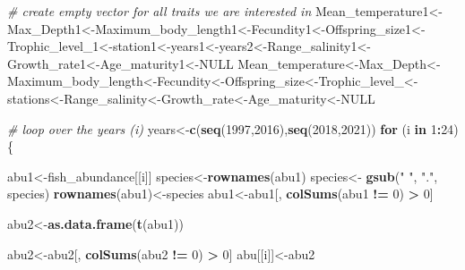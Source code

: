 \documentclass[
]{article}
\newenvironment{Shaded}{\begin{snugshade}}{\end{snugshade}}
\newcommand{\CommentTok}[1]{\textcolor[rgb]{0.56,0.35,0.01}{\textit{#1}}}
\newcommand{\ConstantTok}[1]{\textcolor[rgb]{0.56,0.35,0.01}{#1}}
\newcommand{\ControlFlowTok}[1]{\textcolor[rgb]{0.13,0.29,0.53}{\textbf{#1}}}
\newcommand{\DecValTok}[1]{\textcolor[rgb]{0.00,0.00,0.81}{#1}}
\newcommand{\FunctionTok}[1]{\textcolor[rgb]{0.13,0.29,0.53}{\textbf{#1}}}
\newcommand{\NormalTok}[1]{#1}
\newcommand{\OtherTok}[1]{\textcolor[rgb]{0.56,0.35,0.01}{#1}}
\newcommand{\SpecialCharTok}[1]{\textcolor[rgb]{0.81,0.36,0.00}{\textbf{#1}}}
\newcommand{\StringTok}[1]{\textcolor[rgb]{0.31,0.60,0.02}{#1}}
\begin{document}
\begin{Shaded}
\begin{Highlighting}[]
\CommentTok{\# create empty vector for all traits we are interested in }
\NormalTok{Mean\_temperature1}\OtherTok{\textless{}{-}}\NormalTok{Max\_Depth1}\OtherTok{\textless{}{-}}\NormalTok{Maximum\_body\_length1}\OtherTok{\textless{}{-}}\NormalTok{Fecundity1}\OtherTok{\textless{}{-}}\NormalTok{Offspring\_size1}\OtherTok{\textless{}{-}}\NormalTok{Trophic\_level\_1}\OtherTok{\textless{}{-}}\NormalTok{station1}\OtherTok{\textless{}{-}}\NormalTok{years1}\OtherTok{\textless{}{-}}\NormalTok{years2}\OtherTok{\textless{}{-}}\NormalTok{Range\_salinity1}\OtherTok{\textless{}{-}}\NormalTok{Growth\_rate1}\OtherTok{\textless{}{-}}\NormalTok{Age\_maturity1}\OtherTok{\textless{}{-}}\ConstantTok{NULL}
\NormalTok{Mean\_temperature}\OtherTok{\textless{}{-}}\NormalTok{Max\_Depth}\OtherTok{\textless{}{-}}\NormalTok{Maximum\_body\_length}\OtherTok{\textless{}{-}}\NormalTok{Fecundity}\OtherTok{\textless{}{-}}\NormalTok{Offspring\_size}\OtherTok{\textless{}{-}}\NormalTok{Trophic\_level\_}\OtherTok{\textless{}{-}}\NormalTok{stations}\OtherTok{\textless{}{-}}\NormalTok{Range\_salinity}\OtherTok{\textless{}{-}}\NormalTok{Growth\_rate}\OtherTok{\textless{}{-}}\NormalTok{Age\_maturity}\OtherTok{\textless{}{-}}\ConstantTok{NULL}

\CommentTok{\# loop over the years (i)}
\NormalTok{years}\OtherTok{\textless{}{-}}\FunctionTok{c}\NormalTok{(}\FunctionTok{seq}\NormalTok{(}\DecValTok{1997}\NormalTok{,}\DecValTok{2016}\NormalTok{),}\FunctionTok{seq}\NormalTok{(}\DecValTok{2018}\NormalTok{,}\DecValTok{2021}\NormalTok{))}
\ControlFlowTok{for}\NormalTok{ (i }\ControlFlowTok{in} \DecValTok{1}\SpecialCharTok{:}\DecValTok{24}\NormalTok{)\{}
  
\NormalTok{  abu1}\OtherTok{\textless{}{-}}\NormalTok{fish\_abundance[[i]]}
\NormalTok{  species}\OtherTok{\textless{}{-}}\FunctionTok{rownames}\NormalTok{(abu1)}
\NormalTok{  species}\OtherTok{\textless{}{-}} \FunctionTok{gsub}\NormalTok{(}\StringTok{" "}\NormalTok{, }\StringTok{"."}\NormalTok{, species)}
  \FunctionTok{rownames}\NormalTok{(abu1)}\OtherTok{\textless{}{-}}\NormalTok{species}
\NormalTok{  abu1}\OtherTok{\textless{}{-}}\NormalTok{abu1[, }\FunctionTok{colSums}\NormalTok{(abu1 }\SpecialCharTok{!=} \DecValTok{0}\NormalTok{) }\SpecialCharTok{\textgreater{}} \DecValTok{0}\NormalTok{]}
  
\NormalTok{  abu2}\OtherTok{\textless{}{-}}\FunctionTok{as.data.frame}\NormalTok{(}\FunctionTok{t}\NormalTok{(abu1))}
  
\NormalTok{  abu2}\OtherTok{\textless{}{-}}\NormalTok{abu2[, }\FunctionTok{colSums}\NormalTok{(abu2 }\SpecialCharTok{!=} \DecValTok{0}\NormalTok{) }\SpecialCharTok{\textgreater{}} \DecValTok{0}\NormalTok{]}
\NormalTok{  abu[[i]]}\OtherTok{\textless{}{-}}\NormalTok{abu2}
  

\end{Highlighting}
\end{Shaded}
\end{document}

